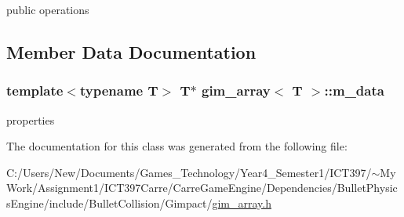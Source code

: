 public operations 

\subsection{Member Data Documentation}
\hypertarget{classgim__array_afb886b0fb48bed8c878d8a82dc4099c}{
\subsubsection[m\_\-data]{\setlength{\rightskip}{0pt plus 5cm}template$<$typename T$>$ T$\ast$ {\bf gim\_\-array}$<$ T $>$::{\bf m\_\-data}}}
\label{classgim__array_afb886b0fb48bed8c878d8a82dc4099c}


properties 

The documentation for this class was generated from the following file:\begin{CompactItemize}
\item 
C:/Users/New/Documents/Games\_\-Technology/Year4\_\-Semester1/ICT397/$\sim$My Work/Assignment1/ICT397Carre/CarreGameEngine/Dependencies/BulletPhysicsEngine/include/BulletCollision/Gimpact/\hyperlink{gim__array_8h}{gim\_\-array.h}\end{CompactItemize}
